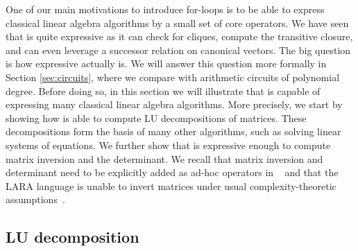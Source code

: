 
One of our main motivations to introduce for-loops is to be able to express classical linear algebra algorithms by a small set of core operators. We have seen that \langfor is
quite expressive as it can check for cliques, compute the transitive closure, and can even
leverage a successor relation on canonical vectors. The big question is how expressive \langfor
actually is. We will answer this question more formally in Section \ref{sec:circuits}, where we compare \langfor with 
arithmetic circuits of polynomial degree.
Before doing so, in this section we will illustrate that \langfor is capable of expressing many classical linear algebra algorithms. More precisely, we start by showing how  \langfor is able to
compute LU decompositions of matrices. These decompositions form the basis of many other algorithms, such as solving linear systems of equations. We further show that \langfor is expressive enough to compute matrix inversion and the determinant. We recall that matrix inversion and determinant need to be explicitly added as ad-hoc operators in \lang~\cite{matlang-journal} and that the LARA language is unable to invert matrices under usual complexity-theoretic assumptions~\cite{BarceloH0S20}.


\subsection{LU decomposition}


